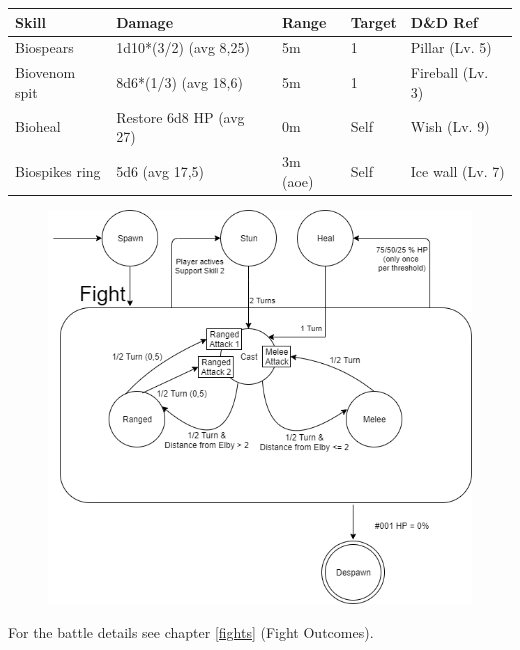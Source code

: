 \begin{center}
	\begin{tabular}[c]{| p{} | p{} | p{2cm} | p{2cm} | p{} | }
		\hline
		\textbf{Skill} & \textbf{Damage} & \textbf{Range} & \textbf{Target} & \textbf{D\&D Ref}\\
		\hline
		Biospears & 1d10*(3/2) (avg 8,25) & 5m & 1 & Pillar (Lv. 5)\\
		\hline
		Biovenom spit & 8d6*(1/3) (avg 18,6) & 5m & 1 & Fireball (Lv. 3)\\
		\hline
		Bioheal & Restore 6d8 HP (avg 27) & 0m & Self & Wish (Lv. 9)\\
		\hline
		Biospikes ring & 5d6 (avg 17,5) & 3m (aoe) & Self & Ice wall (Lv. 7)\\
		\hline
	\end{tabular}
\end{center}
\newpage


\begin{figure}[H]
	\centering
	\includegraphics[width=0.9\linewidth]{images/graphs/fsa/fsa_001.png}
\end{figure}

For the battle details see chapter \ref{fights} (Fight Outcomes).
\newpage









